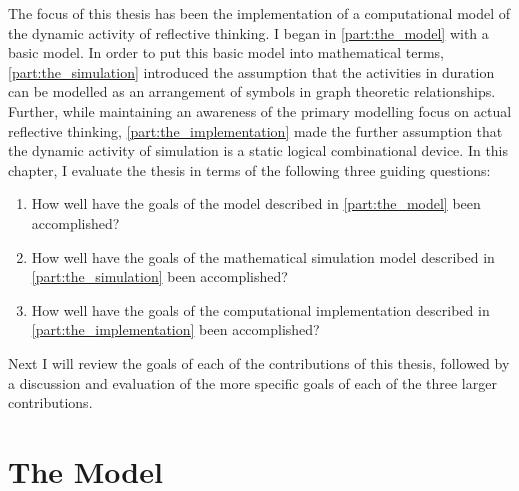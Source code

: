 The focus of this thesis has been the implementation of a
computational model of the dynamic activity of reflective thinking.  I
began in {\mbox{\autoref{part:the_model}}} with a basic model.  In
order to put this basic model into mathematical terms,
{\mbox{\autoref{part:the_simulation}}} introduced the assumption that
the activities in duration can be modelled as an arrangement of
symbols in graph theoretic relationships.  Further, while maintaining
an awareness of the primary modelling focus on actual reflective
thinking, {\mbox{\autoref{part:the_implementation}}} made the further
assumption that the dynamic activity of simulation is a static logical
combinational device.  In this chapter, I evaluate the thesis in terms
of the following three guiding questions:
\begin{enumerate}
\item How well have the goals of the model described in
  {\mbox{\autoref{part:the_model}}} been accomplished?
\item How well have the goals of the mathematical simulation model
  described in {\mbox{\autoref{part:the_simulation}}} been
  accomplished?
\item How well have the goals of the computational implementation
  described in {\mbox{\autoref{part:the_implementation}}} been
  accomplished?
\end{enumerate}
Next I will review the goals of each of the contributions of this
thesis, followed by a discussion and evaluation of the more specific
goals of each of the three larger contributions.

\section{The Model}

